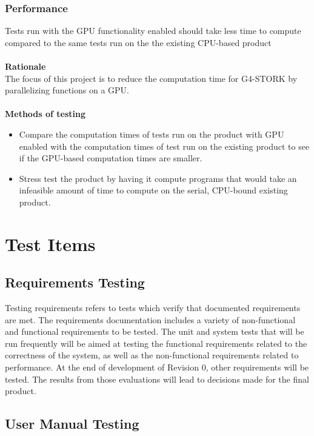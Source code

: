\documentclass[12pt]{article}
\begin{document}
\subsubsection{Performance}
Tests run with the GPU functionality enabled should take less time to compute compared to the same tests run on the the existing CPU-based product\\\\
\textbf{Rationale}\\
The focus of this project is to reduce the computation time for G4-STORK by parallelizing functions on a GPU. \\\\
\textbf{Methods of testing}
\begin{itemize}
\item Compare the computation times of tests run on the product with GPU enabled with the computation times of test run on the existing product to see if the GPU-based computation times are smaller.
\item Stress test the product by having it compute programs that would take an infeasible amount of time to compute on the serial, CPU-bound existing product.
\end{itemize}

\section{Test Items}

\subsection{Requirements Testing} %
Testing requirements refers to tests which verify that documented requirements are met. The requirements documentation includes a variety of non-functional and functional requirements to be tested. The unit and system tests that will be run frequently will be aimed at testing the functional requirements related to the correctness of the system, as well as the non-functional requirements related to performance. At the end of development of Revision 0, other requirements will be tested. The results from those evaluations will lead to decisions made for the final product.

\subsection{User Manual Testing} %
\end{document}
